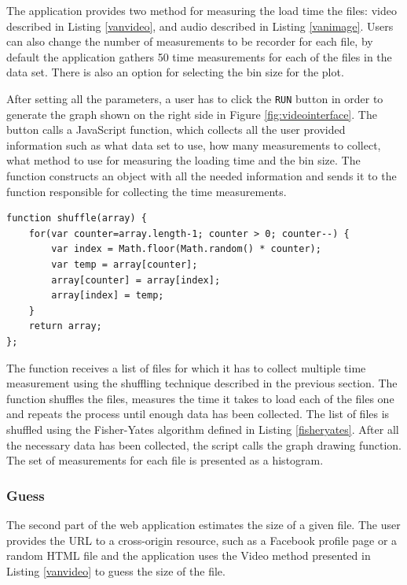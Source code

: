\documentclass[10pt,a4paper,twoside]{book}
\begin{document}
The application provides two method for measuring the load time the files: video described in Listing \ref{vanvideo}, and audio described in Listing \ref{vanimage}. Users can also change the number of measurements to be recorder for each file, by default the application gathers 50 time measurements for each of the files in the data set. There is also an option for selecting the bin size for the plot.

After setting all the parameters, a user has to click the \texttt{RUN} button in order to generate the graph shown on the right side in Figure \ref{fig:videointerface}. The button calls a JavaScript function, which collects all the user provided information such as what data set to use, how many measurements to collect, what method to use for measuring the loading time and the bin size. The function constructs an object with all the needed information and sends it to the function responsible for collecting the time measurements.

\begin{lstlisting}[caption={JavaScript implementation of the Fisher-Yates algorithm},label={fisheryates}]
function shuffle(array) {
	for(var counter=array.length-1; counter > 0; counter--) {
		var index = Math.floor(Math.random() * counter);
		var temp = array[counter];
		array[counter] = array[index];
		array[index] = temp;
	}
	return array;
};
\end{lstlisting}

The function receives a list of files for which it has to collect multiple time measurement using the shuffling technique described in the previous section. The function shuffles the files, measures the time it takes to load each of the files one and repeats the process until enough data has been collected. The list of files is shuffled using the Fisher-Yates algorithm \cite{fisher1949statistical} defined in Listing \ref{fisheryates}. After all the necessary data has been collected, the script calls the graph drawing function. The set of measurements for each file is presented as a histogram.  

\subsubsection{Guess}

The second part of the web application estimates the size of a given file. The user provides the URL to a cross-origin resource, such as a Facebook profile page or a random HTML file and the application uses the Video method presented in Listing \ref{vanvideo} to guess the size of the file.
\end{document}
